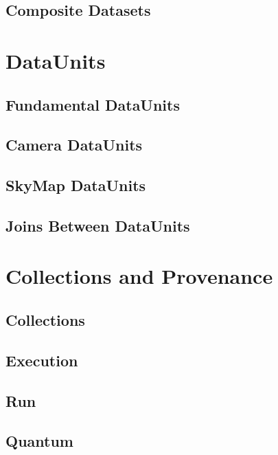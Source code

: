 \documentclass[DM,toc]{lsstdoc}
\begin{document}
\subsection{Composite Datasets}
\label{sec:composite-datasets}


\section{DataUnits}
\label{sec:dataunits}

\subsection{Fundamental DataUnits}
\label{sec:fundamental-dataunits}

\subsection{Camera DataUnits}
\label{sec:camera-dataunits}

\subsection{SkyMap DataUnits}
\label{sec:skymap-dataunits}

\subsection{Joins Between DataUnits}
\label{sec:joins-between-dataunits}


\section{Collections and Provenance}
\label{sec:collections-and-provenance}

\subsection{Collections}
\label{sec:collections}

\subsection{Execution}
\label{sec:excution}

\subsection{Run}
\label{sec:run}

\subsection{Quantum}
\label{sec:quantum}
\end{document}
